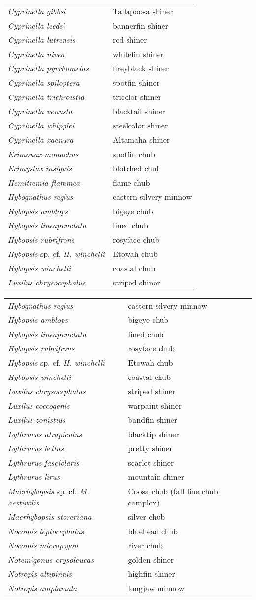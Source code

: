 \documentclass[11pt]{article}
\begin{document}
\begin{tabular}{@{}L{3in}L{3in}@{}}
\textit{Cyprinella gibbsi} &   Tallapoosa shiner\tabularnewline
\textit{Cyprinella leedsi} &   bannerfin shiner\tabularnewline
\textit{Cyprinella lutrensis} &   red shiner\tabularnewline
\textit{Cyprinella nivea} &   whitefin shiner\tabularnewline
\textit{Cyprinella pyrrhomelas} &   fireyblack shiner\tabularnewline
\textit{Cyprinella spiloptera} &   spotfin shiner\tabularnewline
\textit{Cyprinella trichroistia} &   tricolor shiner\tabularnewline
\textit{Cyprinella venusta} &   blacktail shiner\tabularnewline
\textit{Cyprinella whipplei} &   steelcolor shiner\tabularnewline
\textit{Cyprinella xaenura} &   Altamaha shiner\tabularnewline
\textit{Erimonax monachus} &   spotfin chub\tabularnewline
\textit{Erimystax insignis} &   blotched chub\tabularnewline
\textit{Hemitremia flammea} &   flame chub\tabularnewline
\textit{Hybognathus regius} &   eastern silvery minnow\tabularnewline
\textit{Hybopsis amblops} &   bigeye chub\tabularnewline
\textit{Hybopsis lineapunctata} &   lined chub\tabularnewline
\textit{Hybopsis rubrifrons} &   rosyface chub\tabularnewline
\textit{Hybopsis} sp. cf. \textit{H. winchelli} &   Etowah chub\tabularnewline
\textit{Hybopsis winchelli} &   coastal chub\tabularnewline
\textit{Luxilus chrysocephalus} &   striped shiner\tabularnewline
\end{tabular}

\newpage

\vspace{\baselineskip}

%
\textbf{\Student}

\begin{tabular}{@{}L{3in}L{3in}@{}}
\textit{Hybognathus regius} &   eastern silvery minnow\tabularnewline
\textit{Hybopsis amblops} &   bigeye chub\tabularnewline
\textit{Hybopsis lineapunctata} &   lined chub\tabularnewline
\textit{Hybopsis rubrifrons} &   rosyface chub\tabularnewline
\textit{Hybopsis} sp. cf. \textit{H. winchelli} &   Etowah chub\tabularnewline
\textit{Hybopsis winchelli} &   coastal chub\tabularnewline
\textit{Luxilus chrysocephalus} &   striped shiner\tabularnewline
\textit{Luxilus coccogenis} &   warpaint shiner\tabularnewline
\textit{Luxilus zonistius} &   bandfin shiner\tabularnewline
\textit{Lythrurus atrapiculus} &   blacktip shiner\tabularnewline
\textit{Lythrurus bellus} &   pretty shiner\tabularnewline
\textit{Lythrurus fasciolaris} &   scarlet shiner\tabularnewline
\textit{Lythrurus lirus} &   mountain shiner\tabularnewline
\textit{Macrhybopsis} sp. cf. \textit{M. aestivalis} &   Coosa chub (fall line chub complex)\tabularnewline
\textit{Macrhybopsis storeriana} &   silver chub\tabularnewline
\textit{Nocomis leptocephalus} &   bluehead chub\tabularnewline
\textit{Nocomis micropogon} &   river chub\tabularnewline
\textit{Notemigonus crysoleucas} &   golden shiner\tabularnewline
\textit{Notropis altipinnis} &   highfin shiner\tabularnewline
\textit{Notropis amplamala} &   longjaw minnow\tabularnewline
\end{tabular}
\end{document}
